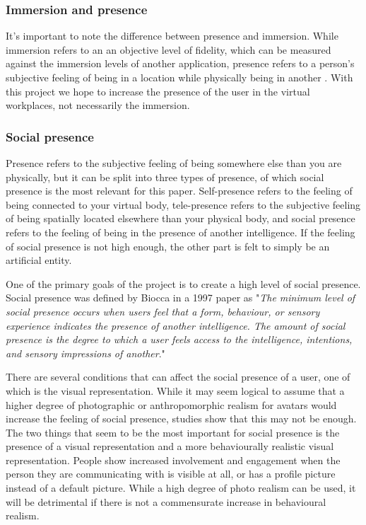   
\subsubsection{Immersion and presence} \label{immersionAndPresence}
It's important to note the difference between presence and immersion. While immersion refers to an an objective level of fidelity, which can be measured against the immersion levels of another application, presence refers to a person's subjective feeling of being in a location while physically being in another \cite{slater2003note}. With this project we hope to increase the presence of the user in the virtual workplaces, not necessarily the immersion.

\subsubsection{Social presence}
\label{section:socialPrecence}
Presence refers to the subjective feeling of being somewhere else than you are physically, but it can be split into three types of presence, of which social presence is the most relevant for this paper. Self-presence refers to the feeling of being connected to your virtual body, tele-presence refers to the subjective feeling of being spatially located elsewhere than your physical body, and social presence refers to the feeling of being in the presence of another intelligence. If the feeling of social presence is not high enough, the other part is felt to simply be an artificial entity.

One of the primary goals of the project is to create a high level of social presence. Social presence was defined by Biocca in a 1997 paper as "\textit{The minimum level of social presence occurs when users feel that a form, behaviour, or sensory experience indicates the presence of another intelligence. The amount of social presence is the degree to which a user feels access to the intelligence, intentions, and sensory impressions of another}\cite{biocca1997cyborg}."

There are several conditions that can affect the social presence of a user, one of which is the visual representation. While it may seem logical to assume that a higher degree of photographic or anthropomorphic realism for avatars would increase the feeling of social presence, studies show that this may not be enough. The two things that seem to be the most important for social presence is the presence of a visual representation and a more behaviourally realistic visual representation. People show increased involvement and engagement when the person they are communicating with is visible at all, or has a profile picture instead of a default picture. While a high degree of photo realism can be used, it will be detrimental if there is not a commensurate increase in behavioural realism\cite{oh2018systematic}.

